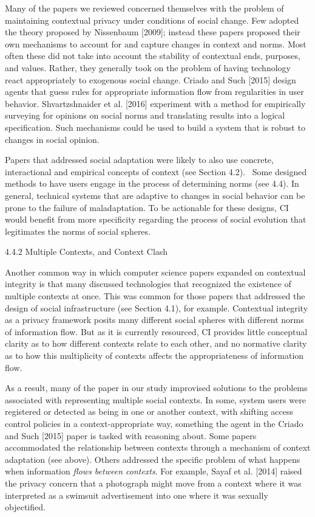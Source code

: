 \documentclass[../thesis.tex]{subfiles}
\begin{document}
\bigskip

Many of the papers we reviewed concerned themselves with the problem of
maintaining contextual privacy under conditions of social change. Few
adopted the theory proposed by Nissenbaum [2009]; instead these papers
proposed their own mechanisms to account for and capture changes in
context and norms. Most often these did not take into account the
stability of contextual ends, purposes, and values. Rather, they
generally took on the problem of having technology react appropriately
to exogenous social change. Criado and Such [2015] design agents that
guess rules for appropriate information flow from regularities in user
behavior. Shvartzshnaider et al. [2016] experiment with a method for
empirically surveying for opinions on social norms and translating
results into a logical specification. Such mechanisms could be used to
build a system that is robust to changes in social opinion.


\bigskip

Papers that addressed social adaptation were likely to also use
concrete, interactional and empirical concepts of context (see Section
4.2). \ Some designed methods to have users engage in the process of
determining norms (see 4.4). In general, technical systems that are
adaptive to changes in social behavior can be prone to the failure of
maladaptation. To be actionable for these designs, CI would benefit
from more specificity regarding the process of social evolution that
legitimates the norms of social spheres.

{\color[rgb]{0.4,0.4,0.4}
4.4.2 Multiple Contexts, and Context Clash }

Another common way in which computer science papers expanded on
contextual integrity is that many discussed technologies that
recognized the existence of multiple contexts at once. This was common
for those papers that addressed the design of social infrastructure
(see Section 4.1), for example. Contextual integrity as a privacy
framework posits many different social spheres with different norms of
information flow. But as it is currently resourced, CI provides little
conceptual clarity as to how different contexts relate to each other,
and no normative clarity as to how this multiplicity of contexts
affects the appropriateness of information flow.


\bigskip

As a result, many of the paper in our study improvised solutions to the
problems associated with representing multiple social contexts. In
some, system users were registered or detected as being in one or
another context, with shifting access control policies in a
context-appropriate way, something the agent in the Criado and Such
[2015] paper is tasked with reasoning about. Some papers accommodated
the relationship between contexts through a mechanism of context
adaptation (see above). Others addressed the specific problem of what
happens when information \textit{flows between contexts}. For example,
Sayaf et al. [2014] raised the privacy concern that a photograph might
move from a context where it was interpreted as a swimsuit
advertisement into one where it was sexually objectified. 
\end{document}
